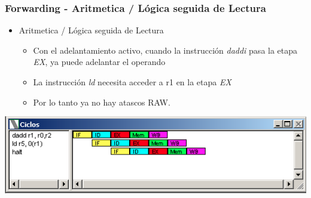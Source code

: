 \documentclass{beamer}
\begin{document}
\begin{frame}[fragile]
\frametitle{Forwarding - Aritmetica / Lógica seguida de Lectura}
\begin{itemize}
\item Aritmetica / Lógica seguida de Lectura
\begin{itemize}
\item Con el adelantamiento activo, cuando la instrucción \emph{daddi} pasa la etapa \emph{EX}, ya puede adelantar el operando
\item La instrucción \emph{ld} necesita acceder a r1 en la etapa \emph{EX}
\item Por lo tanto ya no hay atascos RAW.
\end{itemize}
\end{itemize}
\includegraphics[scale=0.45]{forwarding-8-aritmetica-lectura.png}
\end{frame}
\end{document}
